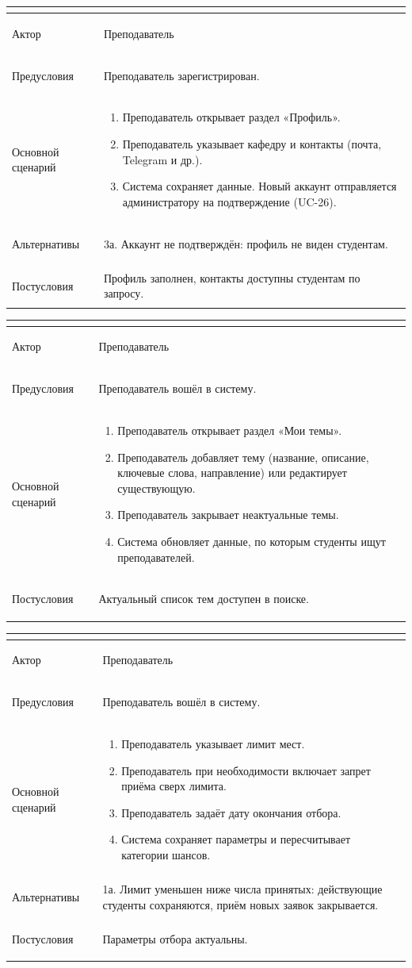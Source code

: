 \documentclass[a4paper,12pt]{article}
\newenvironment{ucd}[3]{%
  \needspace{10\baselineskip}
  \begin{longtable}{|>{\bfseries\raggedright\arraybackslash}p{3.0cm}|p{11.8cm}|}
  \hline
  \multicolumn{2}{|l|}{\textbf{#1.\ #2}}\\ \hline
  Актор & #3\\ \hline
}{\end{longtable}}
\newcommand{\steps}[1]{\begin{enumerate}[nosep,leftmargin=*]#1\end{enumerate}}
\begin{document}
\begin{ucd}{UC-11}{Заполнить профиль и контакты}{Преподаватель}
Предусловия & Преподаватель зарегистрирован.\\ \hline
Основной сценарий & \steps{
 \item Преподаватель открывает раздел «Профиль».
 \item Преподаватель указывает кафедру и контакты (почта, Telegram и др.).
 \item Система сохраняет данные. Новый аккаунт отправляется администратору на подтверждение (UC-26).}\\ \hline
Альтернативы & 3а. Аккаунт не подтверждён: профиль не виден студентам.\\ \hline
Постусловия & Профиль заполнен, контакты доступны студентам по запросу.\\ \hline
\end{ucd}

\begin{ucd}{UC-12}{Вести список своих тем}{Преподаватель}
Предусловия & Преподаватель вошёл в систему.\\ \hline
Основной сценарий & \steps{
 \item Преподаватель открывает раздел «Мои темы».
 \item Преподаватель добавляет тему (название, описание, ключевые слова, направление) или редактирует существующую.
 \item Преподаватель закрывает неактуальные темы.
 \item Система обновляет данные, по которым студенты ищут преподавателей.}\\ \hline
Постусловия & Актуальный список тем доступен в поиске.\\ \hline
\end{ucd}

\begin{ucd}{UC-13}{Задать лимит мест и дату окончания отбора}{Преподаватель}
Предусловия & Преподаватель вошёл в систему.\\ \hline
Основной сценарий & \steps{
 \item Преподаватель указывает лимит мест.
 \item Преподаватель при необходимости включает запрет приёма сверх лимита.
 \item Преподаватель задаёт дату окончания отбора.
 \item Система сохраняет параметры и пересчитывает категории шансов.}\\ \hline
Альтернативы & 1а. Лимит уменьшен ниже числа принятых: действующие студенты сохраняются, приём новых заявок закрывается.\\ \hline
Постусловия & Параметры отбора актуальны.\\ \hline
\end{ucd}
\end{document}
